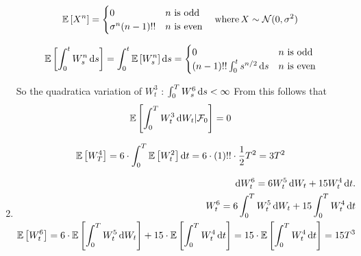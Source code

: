 \begin{sol}
\begin{enumerate}[i]
	\begin{equation}
		\mathbb{E}\left[{X^n}\right] = 
		\begin{cases}
			0 & n \text{ is odd}\\
			\sigma^n (n - 1)!! & n \text{ is even}
		\end{cases} \quad \text{where} \, X \sim \mathcal{N}(0, \sigma^2)
	\end{equation}

	\begin{equation}
		\mathbb{E}\left[{\int_{0}^{t} W^{n}_{s} \mathop{}\!\mathrm{d}{s}}\right] = \int_{0}^{t} \mathbb{E}\left[{W^{n}_{s}}\right] \mathop{}\!\mathrm{d}{s} = \begin{cases}
			0 & n \text{ is odd}\\
			 (n - 1)!! \int_{0}^{t} s^{n/2} \mathop{}\!\mathrm{d}{s} & n \text{ is even}
		\end{cases}
	\end{equation}

	So the quadratica variation of  $W^3_t$ : $\int_{0}^{T} W^6_s \mathop{}\!\mathrm{d}{s} < \infty$
	From this follows that
	 \begin{equation}
		\mathbb{E}\left[{\int_{0}^{T}  W^3_t \mathop{}\!\mathrm{d}{W}_t| \mathcal{F}_0}\right] = 0
	\end{equation}
 	
 	\begin{equation}
 		\mathbb{E}\left[{W^4_T}\right] = 6 \cdot \int_{0}^{T}\mathbb{E}\left[{ W^2_t }\right]  \mathop{}\!\mathrm{d}{t} = 6 \cdot (1)!! \cdot \frac{1}{2} T^2 = 3 T^2
 	\end{equation}
 
 
 	\item 
 	\begin{equation}
 		\begin{aligned}
 			\diff W_{t}^{6} = 6 W_t^{5} \diff W_t + 15 W^4_t \diff t. \\
 			 W_{t}^{6} = 6 \int_{0}^{T} W_t^{5} \diff W_t + 15  \int_{0}^{T} W^4_t \diff t \\
 			 \Expec{W_{t}^{6}} = 6 \cdot \Expec{\int_{0}^{T} W_t^{5} \diff W_t} + 15 \cdot  \Expec{\int_{0}^{T} W^4_t \diff t} = 15 \cdot \Expec{\int_{0}^{T} W^4_t \diff t} = 15 T^3
 		\end{aligned}
 	\end{equation}
	\end{enumerate}
\end{sol}

